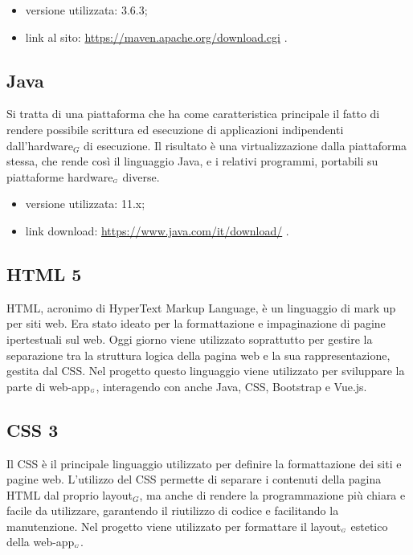 \begin{itemize}
	\item versione utilizzata: 3.6.3;
	\item link al sito: \url{https://maven.apache.org/download.cgi} .
\end{itemize}

\subsection{Java}\label{TecnologieJava}
Si tratta di una piattaforma che ha come caratteristica principale il fatto di rendere possibile scrittura ed esecuzione di applicazioni indipendenti dall'hardware$_G$ di esecuzione.
Il risultato è una virtualizzazione dalla piattaforma stessa, che rende così il linguaggio Java, e i relativi programmi, portabili su piattaforme hardware$_{\scaleto{G}{3pt}}$ diverse.

\begin{itemize}
	\item versione utilizzata: 11.x;
	\item link download: \url{https://www.java.com/it/download/} .
\end{itemize}

\subsection{HTML 5}\label{TecnologieHTML}
HTML, acronimo di HyperText Markup Language, è un linguaggio di mark up per siti web.
Era stato ideato per la formattazione e impaginazione di pagine ipertestuali sul web.
Oggi giorno viene utilizzato soprattutto per gestire la separazione tra la struttura logica della pagina web e la sua rappresentazione, gestita dal CSS.
Nel progetto questo linguaggio viene utilizzato per sviluppare la parte di web-app$_{\scaleto{G}{3pt}}$, interagendo con anche Java, CSS, Bootstrap e Vue.js.


\subsection{CSS 3}\label{TecnologieCSS}
Il CSS è il principale linguaggio utilizzato per definire la formattazione dei siti e pagine web.
L'utilizzo del CSS permette di separare i contenuti della pagina HTML dal proprio layout$_G$, ma anche di rendere la programmazione più chiara e facile da utilizzare, garantendo il riutilizzo di codice e facilitando la manutenzione.
Nel progetto viene utilizzato per formattare il layout$_{\scaleto{G}{3pt}}$ estetico della web-app$_{\scaleto{G}{3pt}}$.

